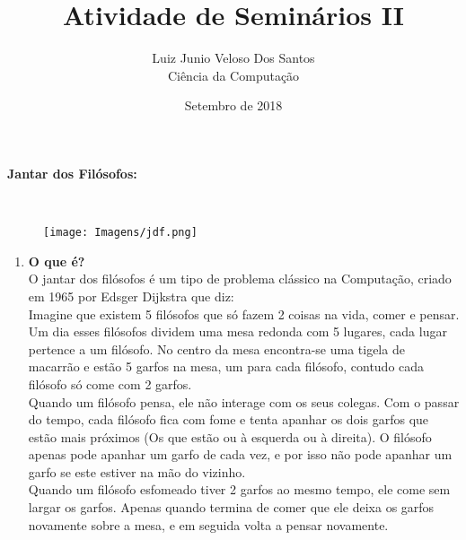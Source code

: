 \documentclass[a4paper, article]{article}
\begin{document}
 
    \title{\vspace{-3cm}Atividade de Seminários II}
    \author{Luiz Junio Veloso Dos Santos\\ Ciência da Computação}
    \date{Setembro de 2018}
    \maketitle

    \begin{enumerate}
        {\large \item \textbf{Jantar dos Filósofos:}}\\
            \begin{figure}[h]
                \centering
                \texttt{[image: Imagens/jdf.png]}
            \end{figure}
            \begin{enumerate}
                \item \textbf{O que é?}\\
                O jantar dos filósofos é um tipo de problema clássico na Computação, criado
                em 1965 por Edsger Dijkstra que diz:\\
                
                Imagine que existem 5 filósofos que só fazem 2 coisas na vida, comer e pensar.
                Um dia esses filósofos dividem uma mesa redonda com 5 lugares, cada lugar pertence
                a um filósofo. No centro da mesa encontra-se uma tigela de macarrão e 
                estão 5 garfos na mesa, um para cada filósofo, contudo cada filósofo só come com 2
                garfos.\\
                Quando um filósofo pensa, ele não interage com os seus colegas. Com o passar do tempo,
                cada filósofo fica com fome e tenta apanhar os dois garfos que estão mais próximos
                (Os que estão ou à esquerda ou à direita). O filósofo apenas pode apanhar um garfo
                de cada vez, e por isso não pode apanhar um garfo se este estiver na mão do vizinho.\\
                Quando um filósofo esfomeado tiver 2 garfos ao mesmo tempo, ele come sem largar os garfos.
                Apenas quando termina de comer que ele deixa os garfos novamente sobre a mesa, e em seguida
                volta a pensar novamente.\\ 


\end{enumerate}
\end{enumerate}
\end{document}
